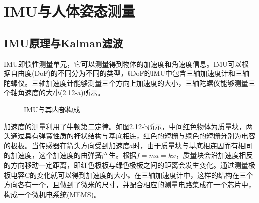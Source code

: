 \section{IMU与人体姿态测量}
\subsection{IMU原理与Kalman滤波}
IMU即惯性测量单元，它可以测量得到物体的加速度和角速度信息。IMU可以根据自由度(DoF)的不同分为不同的类型，6DoF的IMU中包含三轴加速度计和三轴陀螺仪。三轴加速度计能够测量三个方向上加速度的大小，三轴陀螺仪能够测量三个轴角速度的大小(2.12-a)所示。
\begin{figure}[htb]
    \caption{IMU与其内部构成}
    \label{fig:subfigss}
\end{figure}

加速度的测量利用了牛顿第二定律。如图2.12-b所示，中间红色物体为质量块，两头通过具有弹簧性质的杆状结构与基底相连，红色的短栅与绿色的短栅分别为电容的极板。当传感器在箭头方向受到加速度$a$时，由于质量块与基底相连因而有相同的加速度，这个加速度的由弹簧产生。根据$f=ma=kx$，质量块会沿加速度相反的方向移动一定距离，即红色极板与绿色极板之间的距离会发生变化。通过测量极板电容C的变化就可以得到加速度的大小。在三轴加速度计中，这样的结构在三个方向各有一个，且做到了微米的尺寸，并配合相应的测量电路集成在一个芯片中，构成一个微机电系统(MEMS)。


